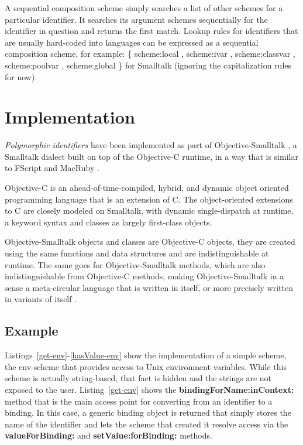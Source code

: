 \documentclass[preprint,authoryear]{acm_proc_article-sp}
\begin{document}
A sequential composition scheme simply searches a list of other schemes
for a particular identifier.  It searches its argument schemes sequentially
for the identifier in question and returns the first match.  Lookup rules for
identifiers that are usually hard-coded into languages can be expressed
as a sequential composition scheme, for example:   \{ scheme:local ,
scheme:ivar , scheme:classvar , scheme:poolvar , scheme:global \} for Smalltalk 
(ignoring the capitalization rules for now).




\section{Implementation}
\label{implementation}

\emph{Polymorphic identifiers} have been implemented as part of Objective-Smalltalk \cite{objst},
a Smalltalk dialect built on top of the Objective-C\cite{objc-evol}\cite{objc-apple} runtime, 
in a way that is similar to FScript\cite{fscript} and MacRuby \cite{macruby}.

Objective-C is an ahead-of-time-compiled, hybrid, and dynamic object oriented programming language
that is an extension of C.  The object-oriented extensions to C are closely modeled on
Smalltalk, with dynamic single-dispatch at runtime, a keyword syntax and classes as
largely first-class objects.

Objective-Smalltalk objects and classes are Objective-C objects, they are created using
the same functions and data structures and are indistinguishable at runtime.
The same goes for Objective-Smalltalk methods, which are also indistinguishable from
Objective-C methods, making Objective-Smalltalk in a sense a meta-circular language
that is written in itself, or more precisely written in variants of itself \cite{kleinvm}\cite{squeak}.



\subsection{Example}

Listings~\ref{get-env}-\ref{hasValue-env} show the implementation of a simple scheme,
the env-scheme that provides access to Unix environment variables.  While this scheme
is actually string-based, that fact is hidden and the strings are not exposed to the user.
Listing~\ref{get-env}
shows the {\bf bindingForName:inContext:} method that is the main access point for
converting from an identifier to a binding.  In this case, a generic binding object is returned
that simply stores the name of the identifier and lets the scheme that created it resolve
access via the {\bf valueForBinding:} and {\bf setValue:forBinding:} methods.
\end{document}
